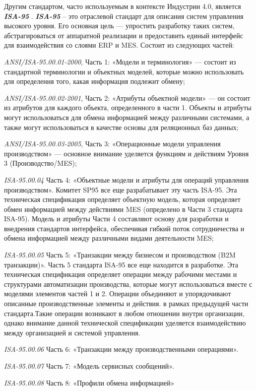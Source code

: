 Другим стандартом, часто используемым в контексте Индустрии 4.0, является \textit{\textbf{ISA-95}} \cite{ISA95}. \textit{\textbf{ISA-95}} -- это отраслевой стандарт для описания систем управления высокого уровня. Его основная цель — упростить разработку таких систем, абстрагироваться от аппаратной реализации и предоставить единый интерфейс для взаимодействия со слоями ERP и MES. Состоит из следующих частей:
\begin{textitemize}
    \item \textit {ANSI/ISA-95.00.01-2000}, Часть 1: «Модели и терминология» — состоит из стандартной терминологии и объектных моделей, которые можно использовать для определения того, какая информация подлежит обмену;
    \item \textit {ANSI/ISA-95.00.02-2001}, Часть 2: «Атрибуты объектной модели» — он состоит из атрибутов для каждого объекта, определенного в части 1. Объекты и атрибуты могут использоваться для обмена информацией между различными системами, а также могут использоваться в качестве основы для реляционных баз данных;
    \item \textit {ANSI/ISA-95.00.03-2005}, Часть 3: «Операционные модели управления производством» — основное внимание уделяется функциям и действиям Уровня 3 (Производство/MES);
    \item \textit {ISA-95.00.04} Часть 4: «Объектные модели и атрибуты для операций управления производством». Комитет SP95 все еще разрабатывает эту часть ISA-95. Эта техническая спецификация определяет объектную модель, которая определяет обмен информацией между действиями MES (определено в Части 3 стандарта ISA-95). Модель и атрибуты Части 4 составляют основу для разработки и внедрения стандартов интерфейса, обеспечивая гибкий поток сотрудничества и обмена информацией между различными видами деятельности MES;
    \item \textit {ISA-95.00.05} Часть 5: «Транзакции между бизнесом и производством (B2M транзакции)». Часть 5 стандарта ISA-95 все еще находится в разработке. Эта техническая спецификация определяет операции между рабочими местами и структурами автоматизации производства, которые могут использоваться вместе с моделями элементов частей 1 и 2. Операции объединяют и упорядочивают описанные производственные элементы и действия. в рамках предыдущей части стандарта.Такие операции возникают в любом отношении внутри организации, однако внимание данной технической спецификации уделяется взаимодействию между организацией и системой управления.
    \item \textit {ISA-95.00.06} Часть 6: «Транзакции между производственными операциями».
    \item \textit {ISA-95.00.07} Часть 7: «Модель сервисных сообщений».
    \item \textit {ISA-95.00.08} Часть 8: «Профили обмена информацией»
\end{textitemize}


